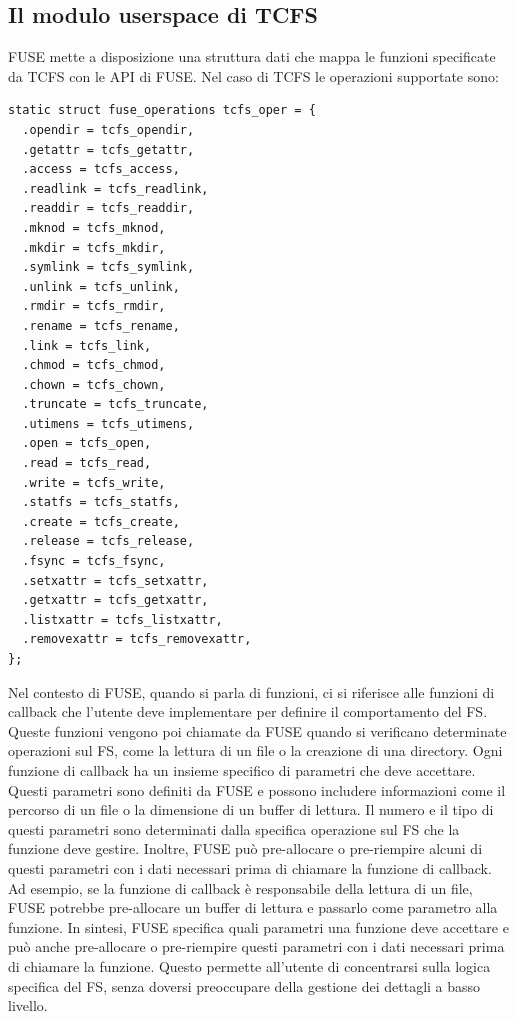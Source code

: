 \subsection{Il modulo userspace di TCFS} 
FUSE mette a disposizione una struttura dati che mappa le funzioni specificate da TCFS con le API di FUSE. Nel caso di TCFS le operazioni supportate sono:
\begin{lstlisting}[style=C, caption=Mappa FUSE API alle funzioni di TCFS , label=C-TCFS-FUNCS]
static struct fuse_operations tcfs_oper = {
  .opendir = tcfs_opendir,
  .getattr = tcfs_getattr,
  .access = tcfs_access,
  .readlink = tcfs_readlink,
  .readdir = tcfs_readdir,
  .mknod = tcfs_mknod,
  .mkdir = tcfs_mkdir,
  .symlink = tcfs_symlink,
  .unlink = tcfs_unlink,
  .rmdir = tcfs_rmdir,
  .rename = tcfs_rename,
  .link = tcfs_link,
  .chmod = tcfs_chmod,
  .chown = tcfs_chown,
  .truncate = tcfs_truncate,
  .utimens = tcfs_utimens,
  .open = tcfs_open,
  .read = tcfs_read,
  .write = tcfs_write,
  .statfs = tcfs_statfs,
  .create = tcfs_create,
  .release = tcfs_release,
  .fsync = tcfs_fsync,
  .setxattr = tcfs_setxattr,
  .getxattr = tcfs_getxattr,
  .listxattr = tcfs_listxattr,
  .removexattr = tcfs_removexattr,
};
\end{lstlisting}
Nel contesto di FUSE, quando si parla di funzioni, ci si riferisce alle funzioni di callback che l’utente deve implementare per definire il comportamento del FS. Queste funzioni vengono poi chiamate da FUSE quando si verificano determinate operazioni sul FS, come la lettura di un file o la creazione di una directory.
Ogni funzione di callback ha un insieme specifico di parametri che deve accettare. Questi parametri sono definiti da FUSE e possono includere informazioni come il percorso di un file o la dimensione di un buffer di lettura. Il numero e il tipo di questi parametri sono determinati dalla specifica operazione sul FS che la funzione deve gestire.
Inoltre, FUSE può pre-allocare o pre-riempire alcuni di questi parametri con i dati necessari prima di chiamare la funzione di callback. Ad esempio, se la funzione di callback è responsabile della lettura di un file, FUSE potrebbe pre-allocare un buffer di lettura e passarlo come parametro alla funzione.
In sintesi, FUSE specifica quali parametri una funzione deve accettare e può anche pre-allocare o pre-riempire questi parametri con i dati necessari prima di chiamare la funzione. Questo permette all’utente di concentrarsi sulla logica specifica del FS, senza doversi preoccupare della gestione dei dettagli a basso livello.

